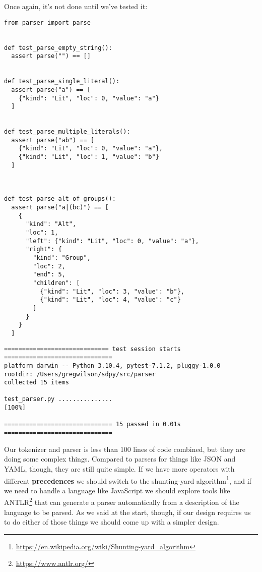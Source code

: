 \documentclass{scrbook}
\newcommand{\glossref}[1]{\textbf{#1}}
\newcommand{\hreffoot}[2]{{#1}\footnote{\href{#2}{#2}}}
\begin{document}
Once again,
it's not done until we've tested it:


\begin{lstlisting}[frame=single,frameround=tttt]
from parser import parse


def test_parse_empty_string():
  assert parse("") == []


def test_parse_single_literal():
  assert parse("a") == [
    {"kind": "Lit", "loc": 0, "value": "a"}
  ]


def test_parse_multiple_literals():
  assert parse("ab") == [
    {"kind": "Lit", "loc": 0, "value": "a"},
    {"kind": "Lit", "loc": 1, "value": "b"}
  ]



def test_parse_alt_of_groups():
  assert parse("a|(bc)") == [
    {
      "kind": "Alt",
      "loc": 1,
      "left": {"kind": "Lit", "loc": 0, "value": "a"},
      "right": {
        "kind": "Group",
        "loc": 2,
        "end": 5,
        "children": [
          {"kind": "Lit", "loc": 3, "value": "b"},
          {"kind": "Lit", "loc": 4, "value": "c"}
        ]
      }
    }
  ]
\end{lstlisting}



\begin{lstlisting}[frame=single,frameround=tttt]
============================= test session starts ==============================
platform darwin -- Python 3.10.4, pytest-7.1.2, pluggy-1.0.0
rootdir: /Users/gregwilson/sdpy/src/parser
collected 15 items

test_parser.py ...............                                           [100%]

============================== 15 passed in 0.01s ==============================
\end{lstlisting}



Our tokenizer and parser is less than 100 lines of code combined,
but they are doing some complex things.
Compared to parsers for things like JSON and YAML,
though,
they are still quite simple.
If we have more operators with different
\glossref{precedences}
we should switch to the
\hreffoot{shunting-yard algorithm}{https://en.wikipedia.org/wiki/Shunting-yard\_algorithm},
and if we need to handle a language like JavaScript we should explore tools like \hreffoot{ANTLR}{https://www.antlr.org/}
that can generate a parser automatically from a description of the language to be parsed.
As we said at the start,
though,
if our design requires us to do either of those things we should come up with a simpler design.
\end{document}

